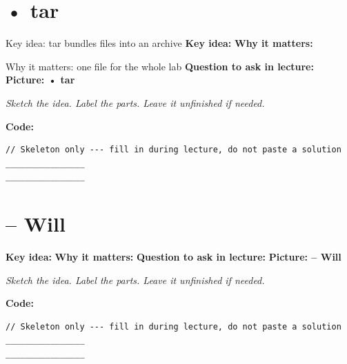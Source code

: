 \documentclass[12pt]{article}
\newcommand{\deflabel}[1]{\noindent\textcolor{slotdef}{\textbf{#1}}}
\newcommand{\drawlabel}[1]{\noindent\textcolor{slotdraw}{\textbf{#1}}}
\begin{document}
\section{• tar}
\par\vspace{0.35em}
{\color{studentink}
Key idea: tar bundles files into an archive
}
\vspace{0.55em}
\Needspace{0.16\textheight}
\deflabel{Key idea:}
\vspace{1.1em}
\Needspace{0.16\textheight}
\deflabel{Why it matters:}
\par\vspace{0.35em}
{\color{studentink}
Why it matters: one file for the whole lab
}
\vspace{0.55em}
\vspace{1.1em}
\Needspace{0.16\textheight}
\deflabel{Question to ask in lecture:}
\vspace{1.1em}
\Needspace{0.28\textheight}
\drawlabel{Picture: • tar}
{\color{slotdraw}
\begin{framed}
\color{ink}
\begin{minipage}[t][0.22\textheight]{\textwidth}
\vspace{0.4em}
\textit{Sketch the idea. Label the parts. Leave it unfinished if needed.}
\end{minipage}
\end{framed}
}
\vspace{1em}
\Needspace{0.18\textheight}
\drawlabel{Code:}
\begin{lstlisting}
// Skeleton only --- fill in during lecture, do not paste a solution
________________
________________
\end{lstlisting}
\vspace{1em}
\section{– Will}
\Needspace{0.16\textheight}
\deflabel{Key idea:}
\vspace{1.1em}
\Needspace{0.16\textheight}
\deflabel{Why it matters:}
\vspace{1.1em}
\Needspace{0.16\textheight}
\deflabel{Question to ask in lecture:}
\vspace{1.1em}
\Needspace{0.28\textheight}
\drawlabel{Picture: – Will}
{\color{slotdraw}
\begin{framed}
\color{ink}
\begin{minipage}[t][0.22\textheight]{\textwidth}
\vspace{0.4em}
\textit{Sketch the idea. Label the parts. Leave it unfinished if needed.}
\end{minipage}
\end{framed}
}
\vspace{1em}
\Needspace{0.18\textheight}
\drawlabel{Code:}
\begin{lstlisting}
// Skeleton only --- fill in during lecture, do not paste a solution
________________
________________
\end{lstlisting}
\vspace{1em}
\end{document}

